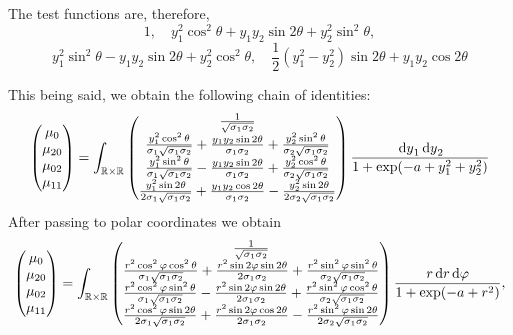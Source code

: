\documentclass{article}
\begin{document}
The test functions are, therefore,
\[
1,\quad  y_1^2\cos^2\theta+y_1y_2\sin 2\theta+y_2^2\sin^2\theta,\]\[  y_1^2\sin^2\theta-y_1y_2\sin 2\theta+y_2^2\cos^2\theta, \quad \frac{1}{2}(y_1^2-y_2^2)\sin2\theta+y_1y_2\cos2\theta
\]

This being said, we obtain the following chain of identities:
\[
	\begin{pmatrix}
		\mu_0\\
		\mu_{20}\\
		\mu_{02}\\
		\mu_{11}
	\end{pmatrix}
	=
	\int_{{\mathbb R}\times{\mathbb R}}^{}\begin{pmatrix}
		\frac{1}{\sqrt{\sigma_1\sigma_2}}\\
		\frac{y_1^2\cos^2\theta}{\sigma_1\sqrt{\sigma_1\sigma_2}}+\frac{y_1y_2\sin 2\theta}{\sigma_1\sigma_2}+\frac{y_2^2\sin^2\theta}{\sigma_2\sqrt{\sigma_1\sigma_2}}\\
		\frac{y_1^2\sin^2\theta}{\sigma_1\sqrt{\sigma_1\sigma_2}}-\frac{y_1y_2\sin 2\theta}{\sigma_1\sigma_2}+\frac{y_2^2\cos^2\theta}{\sigma_2\sqrt{\sigma_1\sigma_2}}\\
		\frac{y_1^2\sin2\theta}{2\sigma_1\sqrt{\sigma_1\sigma_2}}+\frac{y_1y_2\cos 2\theta}{\sigma_1\sigma_2}-\frac{y_2^2\sin2\theta}{2\sigma_2\sqrt{\sigma_1\sigma_2}}\\
	\end{pmatrix}
	\frac{{\,\mathrm dy}_1{\,\mathrm dy}_2}{1+\exp(-a+y_1^2+y_2^2)}
\]
After passing to polar coordinates we obtain
\[
	\begin{pmatrix}
		\mu_0\\
		\mu_{20}\\
		\mu_{02}\\
		\mu_{11}
	\end{pmatrix}
	=
	\int_{{\mathbb R}\times{\mathbb R}}^{}\begin{pmatrix}
		\frac{1}{\sqrt{\sigma_1\sigma_2}}\\
	\frac{r^2\cos^2\varphi\cos^2\theta}{\sigma_1\sqrt{\sigma_1\sigma_2}}+\frac{r^2\sin2\varphi\sin 2\theta}{2\sigma_1\sigma_2}+\frac{r^2\sin^2\varphi\sin^2\theta}{\sigma_2\sqrt{\sigma_1\sigma_2}}\\
		\frac{r^2\cos^2\varphi\sin^2\theta}{\sigma_1\sqrt{\sigma_1\sigma_2}}-\frac{r^2\sin2\varphi\sin 2\theta}{2\sigma_1\sigma_2}+\frac{r^2\sin^2\varphi\cos^2\theta}{\sigma_2\sqrt{\sigma_1\sigma_2}}\\
		\frac{r^2\cos^2\varphi\sin2\theta}{2\sigma_1\sqrt{\sigma_1\sigma_2}}+\frac{r^2\sin2\varphi\cos 2\theta}{2\sigma_1\sigma_2}-\frac{r^2\sin^2\varphi\sin2\theta}{2\sigma_2\sqrt{\sigma_1\sigma_2}}\\
	\end{pmatrix}
	\frac{r\,\mathrm dr\,\mathrm d \varphi}{1+\exp(-a+r^2)},
\]
\end{document}
